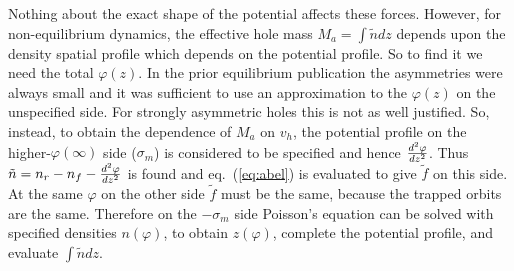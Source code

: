 \documentclass[aip,pop,article-title]{revtex4-2}
\begin{document}
Nothing about the exact shape of the potential affects these
forces.
However, for non-equilibrium dynamics, the effective hole mass
$M_a=\int\tilde n dz$ depends upon the density spatial profile which
depends on the potential profile. So to find it we need the total
$\varphi(z)$. In the prior equilibrium publication the asymmetries
were always small and it was sufficient to use an approximation to the
$\varphi(z)$ on the unspecified side.  For strongly asymmetric holes
this is not as well justified. So, instead, to obtain the dependence
of $M_a$ on $ v_h$, the potential profile on the
higher-$\varphi(\infty)$ side ($\sigma_m$) is considered to be specified and
hence ${d^2\varphi\over dz^2}$. Thus
$\tilde n = n_r-n_f-{d^2\varphi\over dz^2}$ is found and eq.\
(\ref{eq:abel}) is evaluated to give $\tilde f$ on this side. At the
same $\varphi$ on the other side $\tilde f$ must be the same, because
the trapped orbits are the same. Therefore on the $-\sigma_m$ side
Poisson's equation can be solved with specified densities
$n(\varphi)$, to obtain $z(\varphi)$, complete the potential profile, and
evaluate $\int \tilde n dz$.
\end{document}
